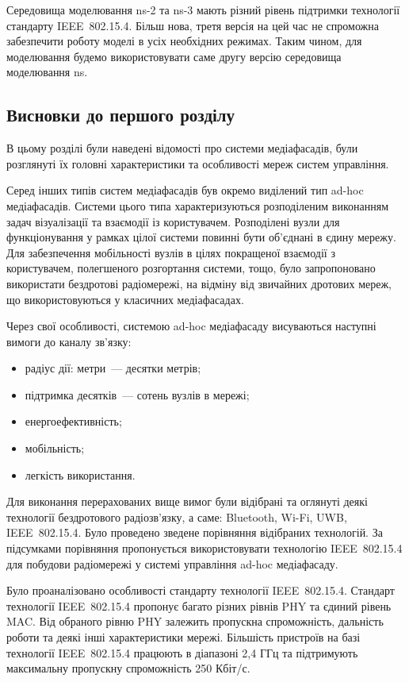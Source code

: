 \documentclass[a4paper,ukrainian,utf8,nocolumnsxix,nocolumnxxxii,nocolumnxxxi,floatsection,equationsection]{eskdtext}
\newcommand{\iee}[0]{IEEE~802.15.4\xspace}
\begin{document}
Середовища моделювання ns-2 та ns-3 мають різний рівень підтримки технології стандарту \iee. Більш нова, третя версія на цей час не спроможна забезпечити роботу моделі в усіх необхідних режимах. Таким чином, для моделювання будемо використовувати саме другу версію середовища моделювання ns.


\subsection{Висновки до першого розділу}

В цьому розділі були наведені відомості про системи медіафасадів, були розглянуті їх головні характеристики та особливості мереж систем управління.

Серед інших типів систем медіафасадів був окремо виділений тип ad-hoc медіафасадів. Системи цього типа характеризуються розподіленим виконанням задач візуалізації та взаємодії із користувачем. Розподілені вузли для функціонування у рамках цілої системи повинні бути об'єднані в єдину мережу. Для забезпечення мобільності вузлів в цілях покращеної взаємодії з користувачем, полегшеного розгортання системи, тощо, було запропоновано використати бездротові радіомережі, на відміну від звичайних дротових мереж, що використовуються у класичних медіафасадах.

Через свої особливості, системою ad-hoc медіафасаду висуваються наступні вимоги до каналу зв'язку:
\begin{itemize}
	\item радіус дії: метри~--- десятки метрів;
	\item підтримка десятків~--- сотень вузлів в мережі;
	\item енергоефективність;
	\item мобільність;
	\item легкість використання.
\end{itemize}

Для виконання перерахованих вище вимог були відібрані та оглянуті деякі технології бездротового радіозв'язку, а саме: Bluetooth, Wi-Fi, UWB, \iee. Було проведено зведене порівняння відібраних технологій. За підсумками порівняння пропонується використовувати технологію \iee для побудови радіомережі у системі управління ad-hoc медіафасаду. 

Було проаналізовано особливості стандарту технології \iee. Стандарт технології \iee пропонує багато різних рівнів PHY та єдиний рівень MAC. Від обраного рівню PHY залежить пропускна спроможність, дальність роботи та деякі інші характеристики мережі. Більшість пристроїв на базі технології \iee працюють в діапазоні 2,4 ГГц та підтримують максимальну пропускну спроможність 250 Кбіт/с. 
\end{document}
